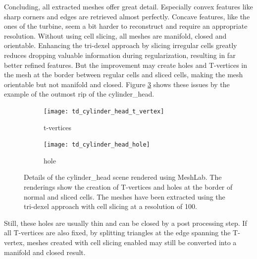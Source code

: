 Concluding, all extracted meshes offer great detail.
Especially convex features like sharp corners and edges are retrieved almost perfectly.
Concave features, like the ones of the turbine, seem a bit harder to reconstruct and require an appropriate resolution.
Without using cell slicing, all meshes are manifold, closed and orientable.
Enhancing the tri-dexel approach by slicing irregular cells greatly reduces dropping valuable information during regularization, resulting in far better refined features.
But the improvement may create holes and T-vertices in the mesh at the border between regular cells and sliced cells, making the mesh orientable but not manifold and closed.
Figure \ref{fig:td_turbine_issues} shows these issues by the example of the outmost rip of the cylinder\_head.
%
\begin{figure}
	\centering
	\begin{subfigure}[b]{0.49\textwidth}
		\centering
		\texttt{[image: td\_cylinder\_head\_t\_vertex]}
		\caption{t-vertices}
		\label{fig:td_cylinder_head_t_vertex}
	\end{subfigure}
	\begin{subfigure}[b]{0.49\textwidth}
		\centering
		\texttt{[image: td\_cylinder\_head\_hole]}
		\caption{hole}
		\label{fig:td_cylinder_head_hole}
	\end{subfigure}
	\caption{
		Details of the cylinder\_head scene rendered using MeshLab.
		The renderings show the creation of T-vertices and holes at the border of normal and sliced cells.
		The meshes have been extracted using the tri-dexel approach with cell slicing at a resolution of 100.
	}
	\label{fig:td_turbine_issues}
\end{figure}
%
Still, these holes are usually thin and can be closed by a post processing step.
If all T-vertices are also fixed, \eg by splitting triangles at the edge spanning the T-vertex, meshes created with cell slicing enabled may still be converted into a manifold and closed result.
